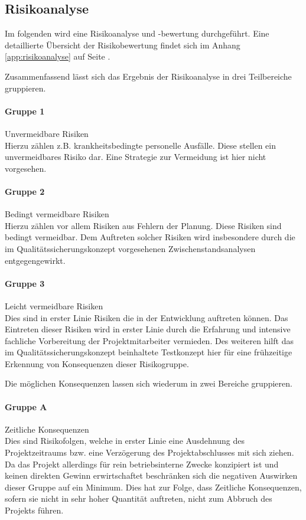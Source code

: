 \documentclass[12pt, xcolor=dvipsnames]{scrartcl}
\begin{document}
\subsection{Risikoanalyse}

Im folgenden wird eine Risikoanalyse und -bewertung durchgeführt.
Eine detaillierte Übersicht der Risikobewertung findet sich im Anhang \ref{app:risikoanalyse} auf Seite \pageref{app:risikoanalyse}.

Zusammenfassend lässt sich das Ergebnis der Risikoanalyse in drei Teilbereiche gruppieren.

\paragraph{Gruppe 1}
Unvermeidbare Risiken \\
Hierzu zählen z.B. krankheitsbedingte personelle Ausfälle. Diese stellen ein unvermeidbares Risiko dar. Eine Strategie zur Vermeidung ist hier nicht vorgesehen.\\

\paragraph{Gruppe 2}
Bedingt vermeidbare Risiken \\
Hierzu zählen vor allem Risiken aus Fehlern der Planung. Diese Risiken sind bedingt vermeidbar. Dem Auftreten solcher Risiken wird insbesondere durch die im  Qualitätssicherungskonzept vorgesehenen Zwischenstandsanalysen entgegengewirkt.

\paragraph{Gruppe 3}
Leicht vermeidbare Risiken \\
Dies sind in erster Linie Risiken die in der Entwicklung auftreten können. Das Eintreten dieser Risiken wird in erster Linie durch die Erfahrung und intensive fachliche Vorbereitung der Projektmitarbeiter vermieden. Des weiteren hilft das im Qualitätssicherungskonzept beinhaltete Testkonzept hier für eine frühzeitige Erkennung von Konsequenzen dieser Risikogruppe.


Die möglichen Konsequenzen lassen sich wiederum in zwei Bereiche gruppieren.

\paragraph{Gruppe A} Zeitliche Konsequenzen \\
Dies sind Risikofolgen, welche in erster Linie eine Ausdehnung des Projektzeitraums bzw. eine Verzögerung des Projektabschlusses mit sich ziehen. Da das Projekt allerdings für rein betriebsinterne Zwecke konzipiert ist und keinen direkten Gewinn erwirtschaftet beschränken sich die negativen Auswirken dieser Gruppe auf ein Minimum. Dies hat zur Folge, dass Zeitliche Konsequenzen, sofern sie nicht in sehr hoher Quantität auftreten, nicht zum Abbruch des Projekts führen.
\end{document}
